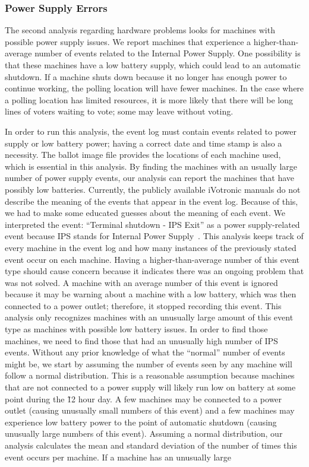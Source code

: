\subsubsection{Power Supply Errors}
The second analysis regarding hardware problems looks for machines with possible power supply issues.  We report machines that experience a higher-than-average number of events related to the Internal Power Supply. One possibility is that these machines have a low battery supply, which could lead to an automatic shutdown.  If a machine shuts down because it no longer has enough power to continue working, the polling location will have fewer machines.  In the case where a polling location has limited resources, it is more likely that there will be long lines of voters waiting to vote; some may leave without voting.  

In order to run this analysis, the event log must contain events related to power supply or low battery power; having a correct date and time stamp is also a necessity.  The ballot image file provides the locations of each machine used, which is essential in this analysis.  By finding the machines with an usually large number of power supply events, our analysis can report the machines that have possibly low batteries.  Currently, the publicly available iVotronic manuals do not describe the meaning of the events that appear in the event log.  Because of this, we had to make some educated guesses about the meaning of each event.  We interpreted the event: \textquotedblleft Terminal shutdown - IPS Exit\textquotedblright \hspace{1 mm} as a power supply-related event because IPS stands for Internal Power Supply~\cite{email2010}.  This analysis keeps track of every machine in the event log and how many instances of the previously stated event occur on each machine.  Having a higher-than-average number of this event type should cause concern because it indicates there was an ongoing problem that was not solved. A machine with an average number of this event is ignored because it may be warning about a machine with a low battery, which was then connected to a power outlet; therefore, it stopped recording this event. This analysis only recognizes machines with an unusually large amount of this event type as machines with possible low battery issues. In order to find those machines, we need to find those that had an unusually high number of IPS events. Without any prior knowledge of what the \textquotedblleft normal\textquotedblright \hspace{1 mm} number of events might be, we start by assuming the number of events seen by any machine will follow a normal distribution. This is a reasonable assumption because machines that are not connected to a power supply will likely run low on battery at some point during the \~12 hour day. A few machines may be connected to a power outlet (causing unusually small numbers of this event) and a few machines may experience low battery power to the point of automatic shutdown (causing unusually large numbers of this event).  Assuming a normal distribution, our analysis calculates the mean and standard deviation of the number of times this event occurs per machine.  If a machine has an unusually large 